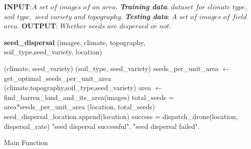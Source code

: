 \documentclass[pmlr,twocolumn,10pt]{jmlr}
\begin{document}
\begin{algorithm} [ht]
\begin{scriptsize}
\begin{algorithmic}[1]
\STATE \textbf{INPUT}:$A$ $set$ $of$ $images$ $of$ $an$ $area$.
\STATE \textit{\textbf{Training data}}: $dataset$ $for$ $climate$ $type,$ $soil$ $type,$ $seed$ $variety$ $and$ $topography.$
\STATE \textit{\textbf{Testing data}}: $A$ $set$ $of$ $images$ $of$ $field$ $area.$
\STATE \textbf{OUTPUT}: $Whether$ $seeds$ $are$ $dispersed$ $or$ $not.$ 
\medbreak

\STATE \textbf{seed\_dispersal}
(images, climate, topography,\\soil\_type,seed\_variety, location) 
    \begin{ALC@g}
    (climate, seed\_variety)
    (soil\_type, seed\_variety)
    \STATE  seeds\_per\_unit\_area $\gets$ {get\_optimal\_seeds\_per\_unit\_area}\\(climate,topography,soil\_type,seed\_variety)
    \STATE  area $\gets$ {find\_barren\_land\_and\_its\_area}(images)
    \STATE  total\_seeds = area*seeds\_per\_unit\_area
    (location, total\_seeds)
    \STATE  seed\_dispersal\_location.append(location)
    \STATE  success = {dispatch\_drone}(location, dispersal\_rate)
        \STATE \Return "seed dispersal successful".
    \ELSE
        \STATE \Return "seed dispersal failed".
    \ENDIF
    \end{ALC@g}
    
\end{algorithmic}
\caption{Main Function}
\end{scriptsize}
\label{algo:resuti}
\end{algorithm}
\end{document}

